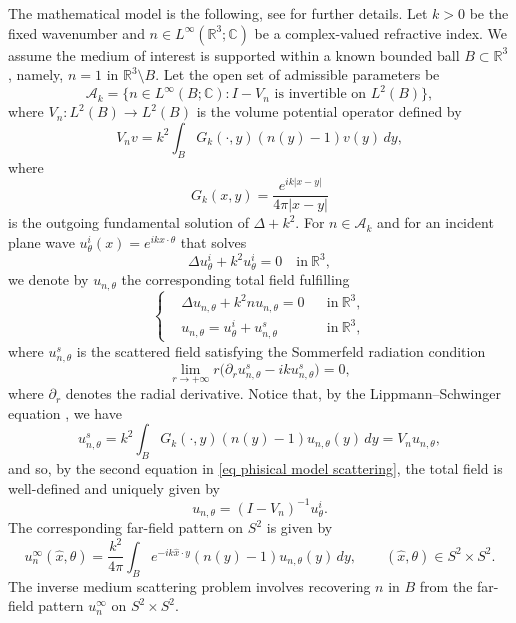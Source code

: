 \documentclass[11pt,oneside]{amsart}
\theoremstyle{plain}
\theoremstyle{definition}
\theoremstyle{remark}
\newcommand{\RR}{\mathbb{R}}
\newcommand{\CC}{\mathbb{C}}
\begin{document}
The mathematical model is the following, see \cite[Chapter 8]{colton1998inverse} for further details. Let $k>0$ be the fixed wavenumber and $n \in L^\infty(\RR^3;\CC)$ be a complex-valued refractive index. We assume the medium of interest is supported within a known bounded ball $B\subset\RR^3$, namely,  $n=1$ in $\RR^3\setminus B$. Let the open set of admissible parameters be
\begin{equation}\label{eq:scattering-admissible-open}
    \mathcal A_k
    =\{n\in L^\infty(B;\CC):I-V_n\text{ is invertible on }L^2(B)\},
\end{equation}
where $V_n\colon L^2(B)\to L^2(B)$ is the volume potential operator \cite[Theorem 8.2]{colton1998inverse} defined by
\begin{equation}\label{eq:volume-potential}
    V_n v
    =k^2\int_B G_k(\cdot,y)(n(y)-1)v(y)\,dy,
\end{equation}
where
\[
    G_k(x,y)=\frac{e^{ik|x-y|}}{4\pi|x-y|}
\]
is the outgoing fundamental solution of $\Delta+k^2$. For $n\in\mathcal A_k$ and for an incident plane wave $u^i_\theta(x)=e^{ik x\cdot \theta}$ that solves
\begin{equation}\label{eq helm}
    \Delta u_\theta^i +k^2 u_\theta^i=0\quad\text{in}~\RR^3,
\end{equation} 
we denote by $u_{n,\theta}$ the corresponding total field fulfilling 
\begin{equation}\label{eq phisical model scattering}
    \left\{\begin{aligned}
    &\Delta u_{n,\theta}+k^2nu_{n,\theta}=0&&\mathrm{in}~\RR^3,\\
    &u_{n,\theta}=u_\theta^i+u_{n,\theta}^s&&\mathrm{in}~\RR^3,
    \end{aligned}\right.   
\end{equation}
where $u_{n,\theta}^s$ is the scattered field satisfying the Sommerfeld radiation condition
\begin{equation}\label{eq sommerfeld cond}
    \lim_{r\to+\infty}r\bigg(\partial_r u^s_{n,\theta}-iku^s_{n,\theta}\bigg)=0,
\end{equation}
where $\partial_r$ denotes the radial derivative. Notice that,
by the Lippmann--Schwinger equation \cite[Equation 8.13]{colton1998inverse}, we have
\begin{equation}\label{eq:lippmann-schwinger}
    u^s_{n,\theta}=k^2\int_{B}G_k(\cdot,y)(n(y)-1)u_{n,\theta}(y)\,dy=V_n u_{n,\theta},
\end{equation}
and so, by the second equation in \eqref{eq phisical model scattering}, the total field is well-defined and uniquely given by
\[
    u_{n,\theta}=(I-V_n)^{-1}u_\theta^i.
\]
The corresponding far-field pattern on $S^2$ is given by \begin{equation}\label{eq:far-field}
    u_n^\infty(\widehat x,\theta)
    =\frac{k^2}{4\pi}\int_B e^{-ik\widehat x\cdot y}(n(y)-1)u_{n,\theta}(y)\,dy,
    \qquad (\widehat x,\theta)\in S^2\times S^2.
\end{equation}
The inverse medium scattering problem involves recovering $n$ in $B$ from the far-field pattern $u_n^\infty$ on $S^2\times S^2$.
\end{document}
